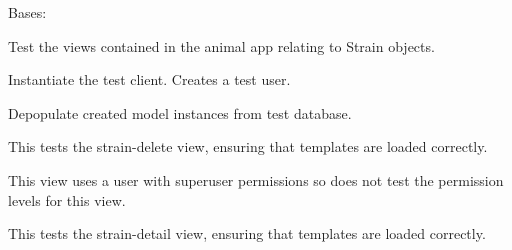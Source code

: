 \documentclass[letterpaper,10pt,english]{sphinxmanual}
\begin{document}
\begin{fulllineitems}
\label{api:mousedb.animal.tests.StrainViewTests}
Bases: 

Test the views contained in the animal app relating to Strain objects.

\begin{fulllineitems}
\label{api:mousedb.animal.tests.StrainViewTests.fixtures}
\end{fulllineitems}


\begin{fulllineitems}
\label{api:mousedb.animal.tests.StrainViewTests.setUp}
Instantiate the test client.  Creates a test user.

\end{fulllineitems}


\begin{fulllineitems}
\label{api:mousedb.animal.tests.StrainViewTests.tearDown}
Depopulate created model instances from test database.

\end{fulllineitems}


\begin{fulllineitems}
\label{api:mousedb.animal.tests.StrainViewTests.test_strain_delete}
This tests the strain-delete view, ensuring that templates are loaded correctly.

This view uses a user with superuser permissions so does not test the permission levels for this view.

\end{fulllineitems}


\begin{fulllineitems}
\label{api:mousedb.animal.tests.StrainViewTests.test_strain_detail}
This tests the strain-detail view, ensuring that templates are loaded correctly.


\end{fulllineitems}
\end{fulllineitems}
\end{document}
